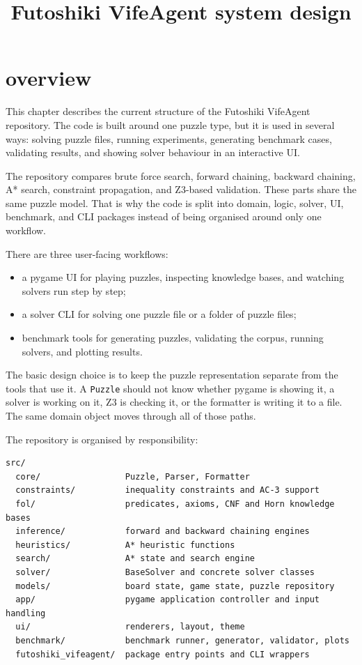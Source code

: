 \documentclass[11pt]{article}
\title{Futoshiki VifeAgent system design}
\author{}
\date{}
\begin{document}
\maketitle

\section{overview}

This chapter describes the current structure of the Futoshiki VifeAgent
repository. The code is built around one puzzle type, but it is used in several
ways: solving puzzle files, running experiments, generating benchmark cases,
validating results, and showing solver behaviour in an interactive UI.

The repository compares brute force search, forward chaining, backward
chaining, A* search, constraint propagation, and Z3-based validation. These
parts share the same puzzle model. That is why the code is split into domain,
logic, solver, UI, benchmark, and CLI packages instead of being organised around
only one workflow.

There are three user-facing workflows:

\begin{itemize}
  \item a pygame UI for playing puzzles, inspecting knowledge bases, and
        watching solvers run step by step;
  \item a solver CLI for solving one puzzle file or a folder of puzzle files;
  \item benchmark tools for generating puzzles, validating the corpus, running
        solvers, and plotting results.
\end{itemize}

The basic design choice is to keep the puzzle representation separate from the
tools that use it. A \texttt{Puzzle} should not know whether pygame is showing
it, a solver is working on it, Z3 is checking it, or the formatter is writing
it to a file. The same domain object moves through all of those paths.

The repository is organised by responsibility:

\begin{verbatim}
src/
  core/                 Puzzle, Parser, Formatter
  constraints/          inequality constraints and AC-3 support
  fol/                  predicates, axioms, CNF and Horn knowledge bases
  inference/            forward and backward chaining engines
  heuristics/           A* heuristic functions
  search/               A* state and search engine
  solver/               BaseSolver and concrete solver classes
  models/               board state, game state, puzzle repository
  app/                  pygame application controller and input handling
  ui/                   renderers, layout, theme
  benchmark/            benchmark runner, generator, validator, plots
  futoshiki_vifeagent/  package entry points and CLI wrappers
\end{verbatim}
\end{document}
